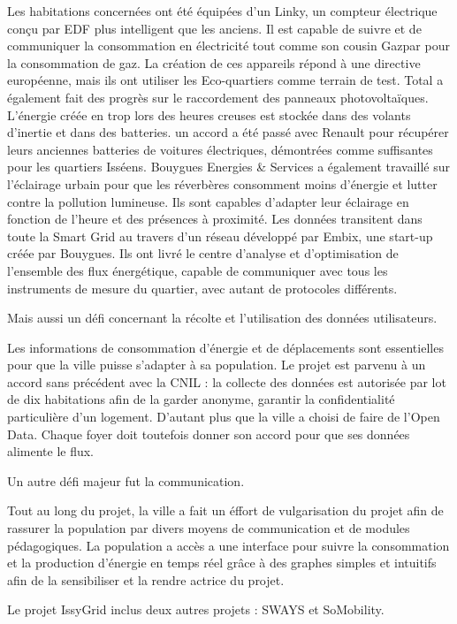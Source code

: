 Les habitations concernées ont été équipées d'un Linky, un compteur électrique conçu par EDF
plus intelligent que les anciens. Il est capable de suivre et de communiquer la consommation en
électricité tout comme son cousin Gazpar pour la consommation de gaz. La création de ces appareils répond
à une directive européenne, mais ils ont utiliser les Eco-quartiers comme terrain de test.
Total a également fait des progrès sur le raccordement des panneaux photovoltaïques.
L'énergie créée en trop lors des heures creuses est stockée dans des volants d'inertie et dans des
batteries. un accord a été passé avec Renault pour récupérer leurs anciennes batteries de voitures
électriques, démontrées comme suffisantes pour les quartiers Isséens.
Bouygues Energies \& Services a également travaillé sur l'éclairage urbain pour que les réverbères
consomment moins d'énergie et lutter contre la pollution lumineuse. Ils sont capables d'adapter
leur éclairage en fonction de l'heure et des présences à proximité.
Les données transitent dans toute la Smart Grid au travers d'un réseau développé par Embix, une
start-up créée par Bouygues. Ils ont livré le centre d'analyse et d'optimisation de l'ensemble des
flux énergétique, capable de communiquer avec tous les instruments de mesure du quartier, avec autant de
protocoles différents.

Mais aussi un défi concernant la récolte et l'utilisation des données utilisateurs.

Les informations de consommation d'énergie et de déplacements sont essentielles pour que la ville
puisse s'adapter à sa population. Le projet est parvenu à un accord sans précédent avec la CNIL :
la collecte des données est autorisée par lot de dix habitations afin de la garder anonyme, garantir
la confidentialité particulière d'un logement.
D'autant plus que la ville a choisi de faire de l'Open Data. Chaque foyer doit toutefois
donner son accord pour que ses données alimente le flux.

Un autre défi majeur fut la communication.

Tout au long du projet, la ville a fait un éffort de vulgarisation du projet afin de rassurer
la population par divers moyens de communication et de modules pédagogiques. La population a accès
a une interface pour suivre la consommation et la production d'énergie en temps réel grâce à des
graphes simples et intuitifs afin de la sensibiliser et la rendre actrice du projet.

Le projet IssyGrid inclus deux autres projets : SWAYS et SoMobility.

